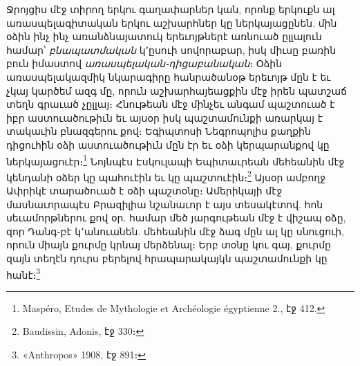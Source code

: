 \documentclass{article}
\begin{document}
{Ջրոյցիս մէջ տիրող երկու գաղափարներ կան, որոնք երկուքն ալ առասպելագիտական երկու աշխարհներ կը ներկայացընեն. մին օձին ինչ ինչ առանձնայատուկ երեւոյթներէ առնուած ըլլալուն համար՝ \emph{բնապատմական} կ՚ըսուի սովորաբար, իսկ միւսը բառին բուն իմաստով \emph{առասպելական֊դիցաբանական}։ Օձին առասպելակազմիկ նկարագիրը հանրածանօթ երեւոյթ մըն է եւ չկայ կարծեմ ազգ մը, որուն աշխարհայեացքին մէջ իրեն պատշաճ տեղն գրաւած չըլլայ։ Հնութեան մէջ մինչեւ անգամ պաշտուած է իբր աստուածութիւն եւ այսօր իսկ պաշտամունքի առարկայ է տակաւին բնազգերու քով։ Եգիպտոսի Նեգրոպոլիս քաղքին դիցուհին օձի աստուածութիւն մըն էր եւ օձի կերպարանքով կը ներկայացուէր։\footnote{Maspéro, Etudes de Mythologie et Archéologie égyptienne 2., էջ 412.} Նոյնպէս Էսկուլապի Եպիտաւրեան մեհեանին մէջ կենդանի օձեր կը պահուէին եւ կը պաշտուէին։\footnote{Baudissin, Adonis, էջ 330։} Այսօր ամբողջ Ափրիկէ տարածուած է օձի պաշտօնը։ Ամերիկայի մէջ մասնաւորապէս Բրազիլիա նշանաւոր է այս տեսակէտով. հոն սեւամորթներու քով օր. համար մեծ յարգութեան մէջ է վիշապ օձը, զոր Դանգ֊բէ կ՚անուանեն. մեհեանին մէջ ձագ մըն ալ կը սնուցուի, որուն միայն քուրմը կրնայ մերձենալ։ Երբ տօնը կու գայ, քուրմը զայն տեղէն դուրս բերելով հրապարակայկն պաշտամունքի կը հանէ։\footnote{«Anthropos» 1908, էջ 891։}

}
\end{document}
